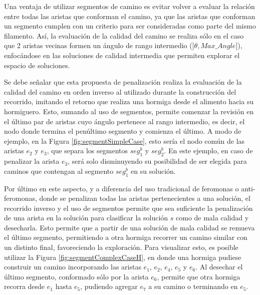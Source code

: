 Una ventaja de utilizar segmentos de camino es evitar volver a evaluar la relaci\'on entre todas las aristas que conforman el camino, ya que las aristas que conforman un segmento cumplen con un criterio para ser consideradas como parte del mismo filamento. As\'i, la evaluaci\'on de la calidad del camino se realiza s\'olo en el caso que 2 aristas vecinas formen un \'angulo de rango intermedio ($]\theta, Max\_Angle]$), enfoc\'andose en las soluciones de calidad intermedia que permiten explorar el espacio de soluciones.


Se debe se\~nalar que esta propuesta de penalizaci\'on realiza la evaluaci\'on de la calidad del camino en orden inverso al utilizado durante la construcci\'on del recorrido, imitando el retorno que realiza una hormiga desde el alimento hacia su hormiguero. Esto, sumando al uso de segmentos, permite comenzar la revisi\'on en el \'ultimo par de aristas cuyo \'angulo pertenece al rango intermedio, es decir, el nodo donde termina el pen\'ultimo segmento y comienza el \'ultimo. A modo de ejemplo, en la Figura \ref{fig:segmentSimpleCase}, esto ser\'ia el nodo com\'un de las aristas $e_2$ y $e_3$, que separa los segmentos $seg^{b}_1$ y $seg^{b}_2$. En este ejemplo, en caso de penalizar la arista $e_3$, ser\'a solo disminuyendo su posibilidad de ser elegida para caminos que contengan al segmento $seg^{b}_1$ en su soluci\'on.



Por \'ultimo en este aspecto, y a diferencia del uso tradicional de feromonas o anti-feromonas, donde se penalizan todas las aristas pertenecientes a una soluci\'on, el recorrido inverso y el uso de segmentos permite que sea suficiente la penalizaci\'on de una arista en la soluci\'on para clasificar la soluci\'on $s$ como de mala calidad y desecharla. Esto permite que a partir de una soluci\'on de mala calidad se remueva el \'ultimo segmento, permitiendo a otra hormiga recorrer un camino similar con un distinto final, favoreciendo la exploraci\'on. Para visualizar esto, es posible utilizar la Figura \ref{fig:segmentComplexCaseH}, en donde una hormiga pudiese construir un camino incorporando las aristas $e_1$, $e_2$, $e_4$, $e_5$ y $e_6$. Al desechar el \'ultimo segmento, conformado s\'olo por la arista $e_6$, permite que otra hormiga recorra desde $e_1$ hasta $e_5$, pudiendo agregar $e_7$ a su camino o terminando en $e_5$. 

